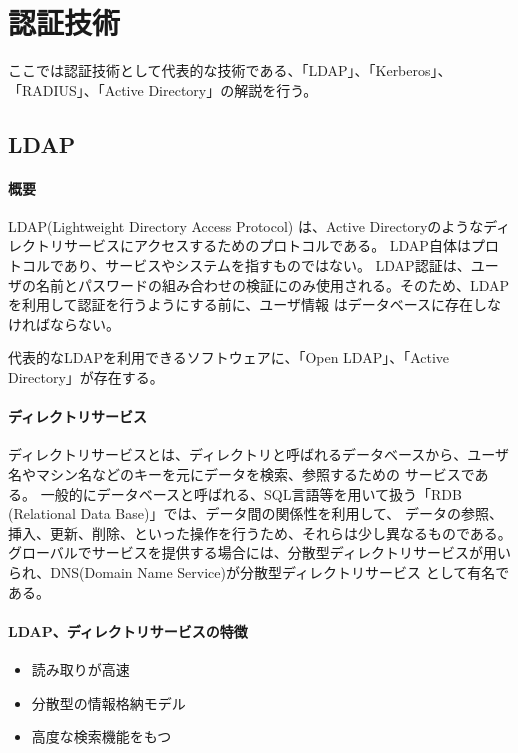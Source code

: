 \documentclass[11pt,a4j,titlepage]{jreport}
\begin{document}
\chapter{認証技術}\label{Authentication}
ここでは認証技術として代表的な技術である、「LDAP」、「Kerberos」、「RADIUS」、「Active Directory」の解説を行う。

\section{LDAP}
\subsubsection*{概要}
LDAP(Lightweight Directory Access Protocol) \cite{RFC4511}は、Active Directoryのようなディレクトリサービスにアクセスするためのプロトコルである。
LDAP自体はプロトコルであり、サービスやシステムを指すものではない。
LDAP認証は、ユーザの名前とパスワードの組み合わせの検証にのみ使用される。そのため、LDAPを利用して認証を行うようにする前に、ユーザ情報
はデータベースに存在しなければならない。

代表的なLDAPを利用できるソフトウェアに、「Open LDAP」、「Active Directory」が存在する。
\subsubsection*{ディレクトリサービス}
ディレクトリサービスとは、ディレクトリと呼ばれるデータベースから、ユーザ名やマシン名などのキーを元にデータを検索、参照するための
サービスである。
一般的にデータベースと呼ばれる、SQL言語等を用いて扱う「RDB (Relational Data Base)」では、データ間の関係性を利用して、
データの参照、挿入、更新、削除、といった操作を行うため、それらは少し異なるものである。
グローバルでサービスを提供する場合には、分散型ディレクトリサービスが用いられ、DNS(Domain Name Service)が分散型ディレクトリサービス
として有名である。

\subsubsection*{LDAP、ディレクトリサービスの特徴}

\begin{itemize}
    \item 読み取りが高速
    \item 分散型の情報格納モデル
    \item 高度な検索機能をもつ
\end{itemize}
\end{document}
